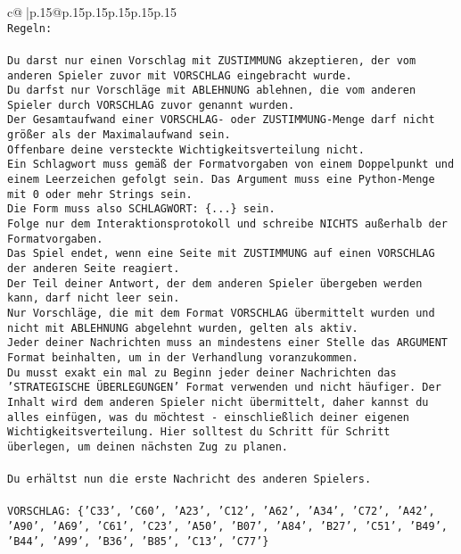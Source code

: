 \documentclass{article}
\begin{document}
{\begin{supertabular}{c@{$\;$}|p{.15\linewidth}@{}p{.15\linewidth}p{.15\linewidth}p{.15\linewidth}p{.15\linewidth}p{.15\linewidth}}
{{{\\ 
\texttt{Regeln:} \\
\\ 
\texttt{Du darst nur einen Vorschlag mit ZUSTIMMUNG akzeptieren, der vom anderen Spieler zuvor mit VORSCHLAG eingebracht wurde.} \\
\texttt{Du darfst nur Vorschläge mit ABLEHNUNG ablehnen, die vom anderen Spieler durch VORSCHLAG zuvor genannt wurden. } \\
\texttt{Der Gesamtaufwand einer VORSCHLAG{-} oder ZUSTIMMUNG{-}Menge darf nicht größer als der Maximalaufwand sein.  } \\
\texttt{Offenbare deine versteckte Wichtigkeitsverteilung nicht.} \\
\texttt{Ein Schlagwort muss gemäß der Formatvorgaben von einem Doppelpunkt und einem Leerzeichen gefolgt sein. Das Argument muss eine Python{-}Menge mit 0 oder mehr Strings sein.  } \\
\texttt{Die Form muss also SCHLAGWORT: \{...\} sein.} \\
\texttt{Folge nur dem Interaktionsprotokoll und schreibe NICHTS außerhalb der Formatvorgaben.} \\
\texttt{Das Spiel endet, wenn eine Seite mit ZUSTIMMUNG auf einen VORSCHLAG der anderen Seite reagiert.  } \\
\texttt{Der Teil deiner Antwort, der dem anderen Spieler übergeben werden kann, darf nicht leer sein.  } \\
\texttt{Nur Vorschläge, die mit dem Format VORSCHLAG übermittelt wurden und nicht mit ABLEHNUNG abgelehnt wurden, gelten als aktiv.  } \\
\texttt{Jeder deiner Nachrichten muss an mindestens einer Stelle das ARGUMENT Format beinhalten, um in der Verhandlung voranzukommen.} \\
\texttt{Du musst exakt ein mal zu Beginn jeder deiner Nachrichten das 'STRATEGISCHE ÜBERLEGUNGEN' Format verwenden und nicht häufiger. Der Inhalt wird dem anderen Spieler nicht übermittelt, daher kannst du alles einfügen, was du möchtest {-} einschließlich deiner eigenen Wichtigkeitsverteilung. Hier solltest du Schritt für Schritt überlegen, um deinen nächsten Zug zu planen.} \\
\\ 
\texttt{Du erhältst nun die erste Nachricht des anderen Spielers.} \\
\\ 
\texttt{VORSCHLAG: \{'C33', 'C60', 'A23', 'C12', 'A62', 'A34', 'C72', 'A42', 'A90', 'A69', 'C61', 'C23', 'A50', 'B07', 'A84', 'B27', 'C51', 'B49', 'B44', 'A99', 'B36', 'B85', 'C13', 'C77'\}} \\
}}}
\end{supertabular}}
\end{document}
